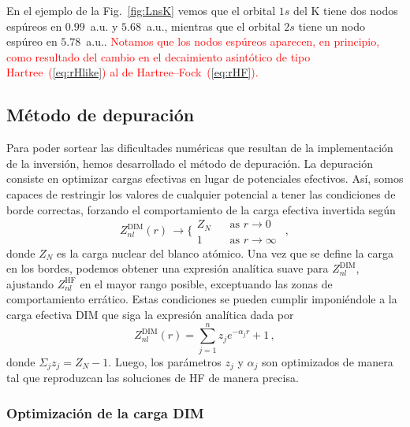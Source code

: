 En el ejemplo de la Fig.~\ref{fig:LnsK} vemos que el orbital $1s$ del K tiene dos nodos espúreos en $0.99$~a.u. y $5.68$~a.u., mientras que el orbital $2s$ tiene un nodo espúreo en $5.78$~a.u.. \textcolor{red}{Notamos que los nodos espúreos aparecen, en principio, como resultado del cambio en el decaimiento asintótico de tipo Hartree~(\ref{eq:rHlike}) al de Hartree--Fock~(\ref{eq:rHF}).}

\subsection{Método de depuración}
\label{subsec:depuracion}

Para poder sortear las dificultades numéricas que resultan de la implementación de la inversión, hemos desarrollado el método de depuración. La depuración consiste en optimizar cargas efectivas en lugar de potenciales efectivos. Así, somos capaces de restringir los valores de cualquier potencial a tener las condiciones de borde correctas, forzando el comportamiento de la carga efectiva invertida según
\begin{equation}
Z_{nl}^{\mathrm{DIM}}(r) \, \rightarrow 
\bigg\{ 
\begin{array}{ll}
Z_{N}  \ \  & \ \ \text{as\ \ }r  \rightarrow 0\  \\ 
1           & \ \ \text{as\ \ }r  \rightarrow \infty \ 
\end{array}\,,
\label{eq:Zasympt}
\end{equation}
donde $Z_N$ es la carga nuclear del blanco atómico. Una vez que se 
define la carga en los bordes, podemos obtener una expresión analítica
suave para $Z_{nl}^{\mathrm{DIM}}$, ajustando $Z_{nl}^{\mathrm{HF}}$ en
el mayor rango posible, exceptuando las zonas de comportamiento errático.
Estas condiciones se pueden cumplir imponiéndole a la carga efectiva 
DIM que siga la expresión analítica dada por
\begin{equation}
Z_{nl}^{\mathrm{DIM}}(r)= \sum_{j=1}^{n} z_j e^{-\alpha_j r}+1 \,,
\label{eq:atomzDIM}
\end{equation}
donde $\Sigma_j z_j=Z_N-1$. Luego, los parámetros $z_j$ y $\alpha_j$ 
son optimizados de manera tal que reproduzcan las soluciones de HF de 
manera precisa.

\subsubsection{Optimización de la carga DIM}
\label{subsec:optDIM}


